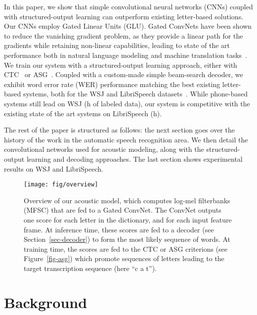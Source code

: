 \documentclass{article}
\begin{document}
In this paper, we show that simple convolutional neural networks (CNNs)
coupled with structured-output learning can outperform existing letter-based
solutions. Our CNNs employ Gated Linear Units (GLU). Gated ConvNets have
been shown to reduce the vanishing gradient problem, as they provide a
linear path for the gradients while retaining non-linear capabilities,
leading to state of the art performance both in natural language modeling
and machine translation tasks~\citep{dauphin2017lm,gehring2017mt}. We train
our system with a structured-output learning approach, either with
CTC~\citep{graves2006connectionist} or ASG~\citep{collobert2016wav2letter}.
Coupled with a custom-made simple beam-search decoder, we exhibit word
 error rate (WER) performance matching the best existing letter-based
 systems, both for the WSJ and LibriSpeech datasets~\citep{panayotov2015librispeech}. 
 While phone-based systems still
lead on WSJ (h of labeled data), our system is competitive with the
existing state of the art systems on LibriSpeech (h).


The rest of the paper is structured as follows: the next section goes over
the history of the work in the automatic speech recognition area.
We then detail the convolutional
networks used for acoustic modeling, along with the structured-output
learning and decoding approaches. The last section shows experimental
results on WSJ and LibriSpeech.







\begin{figure*}
  \vspace*{-0.3cm}
  \centering
\texttt{[image: fig/overview]}
  \caption{
    \label{fig-overview}
    Overview of our acoustic model, which computes log-mel filterbanks (MFSC) that are
    fed to a Gated ConvNet. The ConvNet outputs one score for each letter in
    the dictionary, and for each input feature frame. At inference time, these
    scores are fed to a decoder (see Section~\ref{sec-decoder}) to form
    the most likely sequence of words. At training time, the scores are fed
    to the CTC or ASG criterions (see Figure~\ref{fig-asg}) which promote
    sequences of letters leading to the target transcription sequence (here ``c a
    t'').
  }
\end{figure*}


\section{Background}
\end{document}
